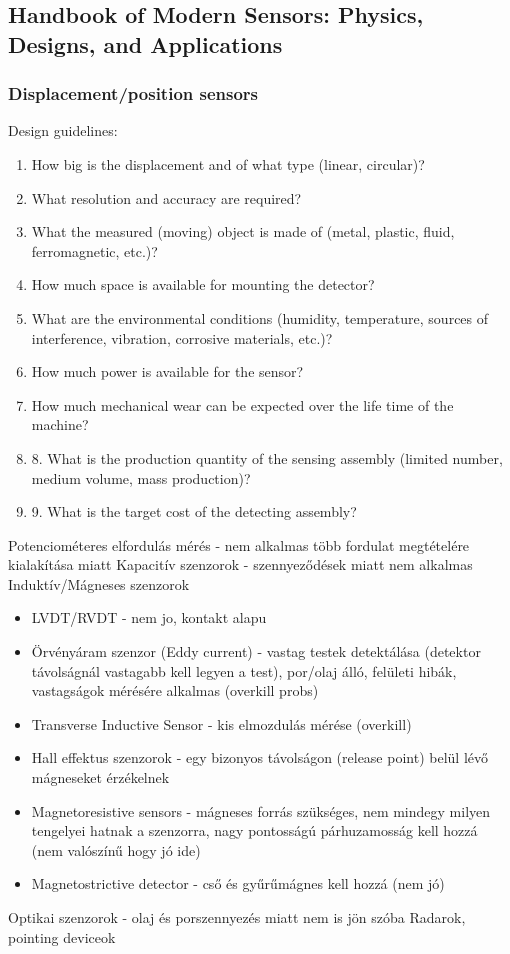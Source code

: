\documentclass{article}
\begin{document}
	\subsection{Handbook of Modern Sensors: Physics, Designs, and Applications}
	\subsubsection{Displacement/position sensors}
	Design guidelines:
	\begin{enumerate}
		\item How big is the displacement and of what type (linear, circular)?
		\item What resolution and accuracy are required?
		\item What the measured (moving) object is made of (metal, plastic, fluid, ferromagnetic, etc.)?
		\item How much space is available for mounting the detector?
		\item What are the environmental conditions (humidity, temperature, sources of
		interference, vibration, corrosive materials, etc.)?
		\item How much power is available for the sensor?
		\item How much mechanical wear can be expected over the life time of the machine?
		\item 8. What is the production quantity of the sensing assembly (limited number,
		medium volume, mass production)?
		\item 9. What is the target cost of the detecting assembly?
	\end{enumerate}
	
	Potenciométeres elfordulás mérés - nem alkalmas több fordulat megtételére kialakítása miatt
	Kapacitív szenzorok - szennyeződések miatt nem alkalmas
	Induktív/Mágneses szenzorok
	\begin{itemize}
		\item LVDT/RVDT - nem jo, kontakt alapu
		\item Örvényáram szenzor (Eddy current) - vastag testek detektálása (detektor távolságnál vastagabb kell legyen a test), por/olaj álló, felületi hibák, vastagságok mérésére alkalmas (overkill probs)
		\item Transverse Inductive Sensor - kis elmozdulás mérése (overkill)
		\item Hall effektus szenzorok - egy bizonyos távolságon (release point) belül lévő mágneseket érzékelnek
		\item Magnetoresistive sensors - mágneses forrás szükséges, nem mindegy milyen tengelyei hatnak a szenzorra, nagy pontosságú párhuzamosság kell hozzá (nem valószínű hogy jó ide)
		\item Magnetostrictive detector - cső és gyűrűmágnes kell hozzá (nem jó)
	\end{itemize}
	Optikai szenzorok - olaj és porszennyezés miatt nem is jön szóba
	Radarok, pointing deviceok
	
\end{document}
